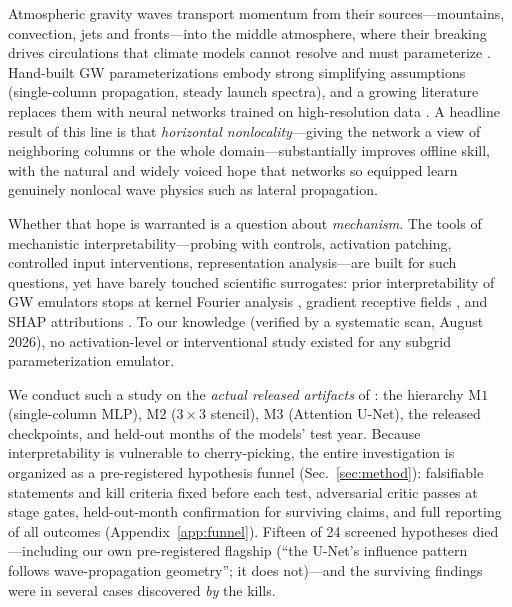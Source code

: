 \documentclass[10pt,twocolumn]{article}
\newcommand{\Mone}{\mathrm{M1}}
\newcommand{\Mtwo}{\mathrm{M2}}
\newcommand{\Mthree}{\mathrm{M3}}
\begin{document}
Atmospheric gravity waves transport momentum from their sources---mountains, convection, jets and fronts---into the middle atmosphere, where their breaking drives circulations that climate models cannot resolve and must parameterize \citep{fritts2003}. Hand-built GW parameterizations embody strong simplifying assumptions (single-column propagation, steady launch spectra), and a growing literature replaces them with neural networks trained on high-resolution data \citep{espinosa2022,hardiman2023,gupta2024ml,gupta2025}. A headline result of this line is that \emph{horizontal nonlocality}---giving the network a view of neighboring columns or the whole domain---substantially improves offline skill, with the natural and widely voiced hope that networks so equipped learn genuinely nonlocal wave physics such as lateral propagation.

Whether that hope is warranted is a question about \emph{mechanism}. The tools of mechanistic interpretability---probing with controls, activation patching, controlled input interventions, representation analysis---are built for such questions, yet have barely touched scientific surrogates: prior interpretability of GW emulators stops at kernel Fourier analysis \citep{pahlavan2024}, gradient receptive fields \citep{pahlavan2025}, and SHAP attributions \citep{haslauer2026}. To our knowledge (verified by a systematic scan, August 2026), no activation-level or interventional study existed for any subgrid parameterization emulator.

We conduct such a study on the \emph{actual released artifacts} of \citet{gupta2025}: the hierarchy $\Mone$ (single-column MLP), $\Mtwo$ ($3{\times}3$ stencil), $\Mthree$ (Attention U-Net), the released checkpoints, and held-out months of the models' test year. Because interpretability is vulnerable to cherry-picking, the entire investigation is organized as a pre-registered hypothesis funnel (Sec.~\ref{sec:method}): falsifiable statements and kill criteria fixed before each test, adversarial critic passes at stage gates, held-out-month confirmation for surviving claims, and full reporting of all outcomes (Appendix~\ref{app:funnel}). Fifteen of 24 screened hypotheses died---including our own pre-registered flagship (``the U-Net's influence pattern follows wave-propagation geometry''; it does not)---and the surviving findings were in several cases discovered \emph{by} the kills.
\end{document}
